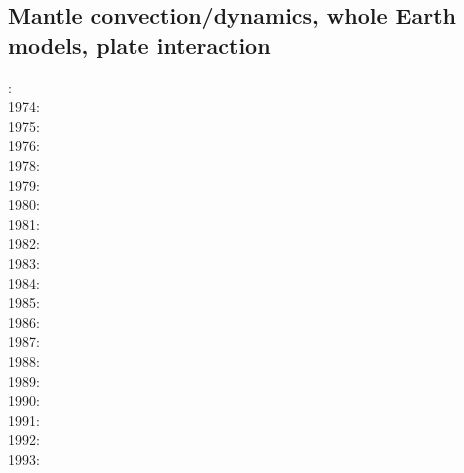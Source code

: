 \subsection{Mantle convection/dynamics, whole Earth models, plate interaction}

{\scriptsize
{}: \cite{pelt72}\\
1974: \cite{youn74}\\
1975: \cite{hemw75}\cite{buss75}\\
1976: \cite{mcri76}\\
1978: \cite{mahz78}\cite{hsui78}\cite{haoc78}\\
1979: \cite{ludt79}\cite{buss79}\cite{shpe79}\cite{rivi89}\\
1980: \cite{olco80}\cite{jamc80}\cite{scsc80}\cite{zess80}\\
1981: \cite{buss81}\cite{jasc81}\cite{haoc81}\\
1982: \cite{jape82}\cite{homc82}\cite{buri82}\\
1983: \cite{hous83}\cite{hous83b}\cite{chri83}\cite{mcke83}\cite{chri83b}\cite{zesd83}\\
1984: \cite{olyb84}\cite{jarv84}\cite{haeb84}\cite{harp84}\cite{davi84}\cite{boas84}\cite{chri84}
      \cite{moca84}\cite{flyu84}\\
1985: \cite{jarv85}\cite{baum85}\cite{chri85}\cite{csra85}\cite{scan85}\\
1986: \cite{davi86}\cite{guda86}\cite{quys86}\\
1987: \cite{yuqh87}\\
1988: \cite{haeb88}\cite{glat88}\\
1989: \cite{besg89}\cite{schm89}\cite{sthe89}\\
1990: \cite{trab90}\cite{gurn90}\cite{ketu90}\cite{sope90}\\
1991: \cite{chha91}\cite{mawe91}\cite{gaot91}\cite{vayv91}\cite{hayk91}\\
1992: \cite{besg92}\cite{mayw92}\cite{vayv92}\cite{chri92}\cite{haym92}\\
1993: \cite{zhch93}\cite{jarv93}\cite{tack93}\cite{bucc93}\cite{carm93}\cite{vavy93}\cite{tasg93}
      \cite{zhgu93}\cite{mamc93}\cite{zebi93}\cite{vayv93}\cite{hayk93}\cite{hayu93}\\
}
